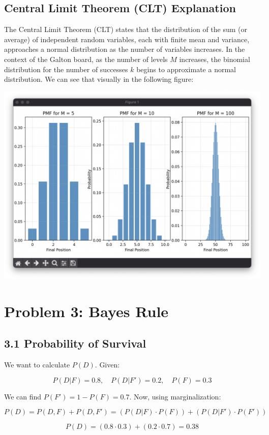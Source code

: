 \documentclass{article}
\begin{document}
\subsection*{Central Limit Theorem (CLT) Explanation}
The Central Limit Theorem (CLT) states that the distribution of the sum (or
average) of independent random variables, each with finite mean and variance,
approaches a normal distribution as the number of variables increases. In the
context of the Galton board, as the number of levels $M$ increases, the binomial
distribution for the number of successes $k$ begins to approximate a normal
distribution. We can see that visually in the following figure:

\includegraphics[width=\linewidth]{clt.png}

\section*{Problem 3: Bayes Rule}

\subsection*{3.1 Probability of Survival}
We want to calculate $P(D)$. Given:

\[
P(D|F) = 0.8, \quad P(D|F') = 0.2, \quad P(F) = 0.3
\]

We can find $P(F') = 1 - P(F) = 0.7$. Now, using marginalization:

\[
P(D) = P(D,F) + P(D,F') = (P(D|F) \cdot P(F)) + (P(D|F') \cdot P(F'))
\]

\[
P(D) = (0.8 \cdot 0.3) + (0.2 \cdot 0.7) = 0.38
\]
\end{document}
